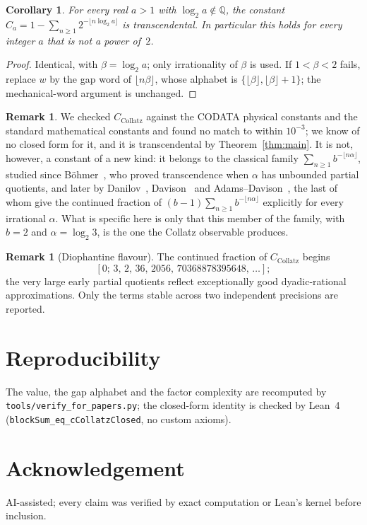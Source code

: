 \documentclass[11pt,a4paper]{article}
\theoremstyle{plain}
\newtheorem{corollary}[theorem]{Corollary}
\theoremstyle{definition}
\newtheorem{remark}[theorem]{Remark}
\newcommand{\CC}{C_{\mathrm{Collatz}}}
\begin{document}
\begin{corollary}
For every real $a>1$ with $\log_2 a\notin\mathbb{Q}$, the constant
$C_a=1-\sum_{n\ge1}2^{-\lfloor n\log_2 a\rfloor}$ is transcendental. In particular this holds
for every integer $a$ that is not a power of~$2$.
\end{corollary}
\begin{proof}
Identical, with $\beta=\log_2 a$; only irrationality of $\beta$ is used. If $1<\beta<2$
fails, replace $w$ by the gap word of $\lfloor n\beta\rfloor$, whose alphabet is
$\{\lfloor\beta\rfloor,\lfloor\beta\rfloor+1\}$; the mechanical-word argument is unchanged.
\end{proof}

\begin{remark}
We checked $\CC$ against the CODATA physical constants and the standard mathematical
constants and found no match to within $10^{-3}$; we know of no closed form for it, and it is transcendental by Theorem~\ref{thm:main}. It is
not, however, a constant of a new kind: it belongs to the classical family
$\sum_{n\ge1} b^{-\lfloor n\alpha\rfloor}$, studied since B\"ohmer~\cite{bohmer}, who proved
transcendence when $\alpha$ has unbounded partial quotients, and later by
Danilov~\cite{danilov}, Davison~\cite{davison} and Adams--Davison~\cite{adamsdavison}, the last
of whom give the continued fraction of $(b-1)\sum_{n\ge1} b^{-\lfloor n\alpha\rfloor}$
explicitly for every irrational $\alpha$. What is specific here is only that this member of
the family, with $b=2$ and $\alpha=\log_2 3$, is the one the Collatz observable produces.
\end{remark}

\begin{remark}[Diophantine flavour]
The continued fraction of $\CC$ begins
\[
  [0;\,3,\,2,\,36,\,2056,\,70368878395648,\,\dots];
\]
the very large early partial quotients reflect exceptionally good dyadic-rational
approximations. Only the terms stable across two independent precisions are reported.
\end{remark}

\section*{Reproducibility}
The value, the gap alphabet and the factor complexity are recomputed by
\texttt{tools/verify\_for\_papers.py}; the closed-form identity is checked by Lean~4
(\texttt{blockSum\_eq\_cCollatzClosed}, no custom axioms).

\section*{Acknowledgement}
AI-assisted; every claim was verified by exact computation or Lean's kernel before inclusion.
\end{document}
